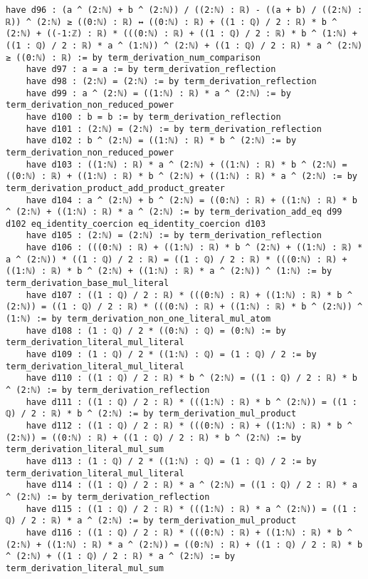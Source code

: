 \documentclass{article}
\begin{document}
\begin{tcolorbox}[colback=white!10, width=\linewidth]
\begin{lstlisting}[language=Lean4]
    have d96 : (a ^ (2:ℕ) + b ^ (2:ℕ)) / ((2:ℕ) : ℝ) - ((a + b) / ((2:ℕ) : ℝ)) ^ (2:ℕ) ≥ ((0:ℕ) : ℝ) ↔ ((0:ℕ) : ℝ) + ((1 : ℚ) / 2 : ℝ) * b ^ (2:ℕ) + ((-1:ℤ) : ℝ) * (((0:ℕ) : ℝ) + ((1 : ℚ) / 2 : ℝ) * b ^ (1:ℕ) + ((1 : ℚ) / 2 : ℝ) * a ^ (1:ℕ)) ^ (2:ℕ) + ((1 : ℚ) / 2 : ℝ) * a ^ (2:ℕ) ≥ ((0:ℕ) : ℝ) := by term_derivation_num_comparison
    have d97 : a = a := by term_derivation_reflection
    have d98 : (2:ℕ) = (2:ℕ) := by term_derivation_reflection
    have d99 : a ^ (2:ℕ) = ((1:ℕ) : ℝ) * a ^ (2:ℕ) := by term_derivation_non_reduced_power
    have d100 : b = b := by term_derivation_reflection
    have d101 : (2:ℕ) = (2:ℕ) := by term_derivation_reflection
    have d102 : b ^ (2:ℕ) = ((1:ℕ) : ℝ) * b ^ (2:ℕ) := by term_derivation_non_reduced_power
    have d103 : ((1:ℕ) : ℝ) * a ^ (2:ℕ) + ((1:ℕ) : ℝ) * b ^ (2:ℕ) = ((0:ℕ) : ℝ) + ((1:ℕ) : ℝ) * b ^ (2:ℕ) + ((1:ℕ) : ℝ) * a ^ (2:ℕ) := by term_derivation_product_add_product_greater
    have d104 : a ^ (2:ℕ) + b ^ (2:ℕ) = ((0:ℕ) : ℝ) + ((1:ℕ) : ℝ) * b ^ (2:ℕ) + ((1:ℕ) : ℝ) * a ^ (2:ℕ) := by term_derivation_add_eq d99 d102 eq_identity_coercion eq_identity_coercion d103
    have d105 : (2:ℕ) = (2:ℕ) := by term_derivation_reflection
    have d106 : (((0:ℕ) : ℝ) + ((1:ℕ) : ℝ) * b ^ (2:ℕ) + ((1:ℕ) : ℝ) * a ^ (2:ℕ)) * ((1 : ℚ) / 2 : ℝ) = ((1 : ℚ) / 2 : ℝ) * (((0:ℕ) : ℝ) + ((1:ℕ) : ℝ) * b ^ (2:ℕ) + ((1:ℕ) : ℝ) * a ^ (2:ℕ)) ^ (1:ℕ) := by term_derivation_base_mul_literal
    have d107 : ((1 : ℚ) / 2 : ℝ) * (((0:ℕ) : ℝ) + ((1:ℕ) : ℝ) * b ^ (2:ℕ)) = ((1 : ℚ) / 2 : ℝ) * (((0:ℕ) : ℝ) + ((1:ℕ) : ℝ) * b ^ (2:ℕ)) ^ (1:ℕ) := by term_derivation_non_one_literal_mul_atom
    have d108 : (1 : ℚ) / 2 * ((0:ℕ) : ℚ) = (0:ℕ) := by term_derivation_literal_mul_literal
    have d109 : (1 : ℚ) / 2 * ((1:ℕ) : ℚ) = (1 : ℚ) / 2 := by term_derivation_literal_mul_literal
    have d110 : ((1 : ℚ) / 2 : ℝ) * b ^ (2:ℕ) = ((1 : ℚ) / 2 : ℝ) * b ^ (2:ℕ) := by term_derivation_reflection
    have d111 : ((1 : ℚ) / 2 : ℝ) * (((1:ℕ) : ℝ) * b ^ (2:ℕ)) = ((1 : ℚ) / 2 : ℝ) * b ^ (2:ℕ) := by term_derivation_mul_product
    have d112 : ((1 : ℚ) / 2 : ℝ) * (((0:ℕ) : ℝ) + ((1:ℕ) : ℝ) * b ^ (2:ℕ)) = ((0:ℕ) : ℝ) + ((1 : ℚ) / 2 : ℝ) * b ^ (2:ℕ) := by term_derivation_literal_mul_sum
    have d113 : (1 : ℚ) / 2 * ((1:ℕ) : ℚ) = (1 : ℚ) / 2 := by term_derivation_literal_mul_literal
    have d114 : ((1 : ℚ) / 2 : ℝ) * a ^ (2:ℕ) = ((1 : ℚ) / 2 : ℝ) * a ^ (2:ℕ) := by term_derivation_reflection
    have d115 : ((1 : ℚ) / 2 : ℝ) * (((1:ℕ) : ℝ) * a ^ (2:ℕ)) = ((1 : ℚ) / 2 : ℝ) * a ^ (2:ℕ) := by term_derivation_mul_product
    have d116 : ((1 : ℚ) / 2 : ℝ) * (((0:ℕ) : ℝ) + ((1:ℕ) : ℝ) * b ^ (2:ℕ) + ((1:ℕ) : ℝ) * a ^ (2:ℕ)) = ((0:ℕ) : ℝ) + ((1 : ℚ) / 2 : ℝ) * b ^ (2:ℕ) + ((1 : ℚ) / 2 : ℝ) * a ^ (2:ℕ) := by term_derivation_literal_mul_sum

\end{lstlisting}
\end{tcolorbox}
\end{document}
